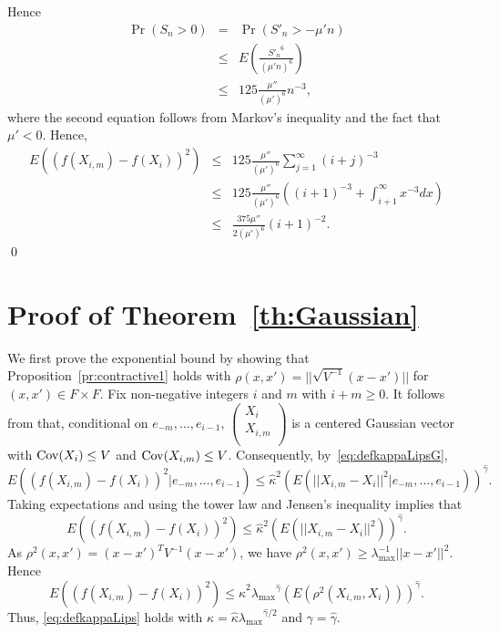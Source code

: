 \documentclass[a4paper,11pt]{article}
\begin{document}
Hence\begin{eqnarray*}
\Pr(S_{n}>0)&=&\Pr(S'_{n}>-\mu'n)\\
&\le&E(\frac{{S'_{n}}^{6}}{(\mu'n)^{6}})\\
&\le&125\frac{\mu''}{(\mu')^{6}}n^{-3},
\end{eqnarray*}where the second equation follows from Markov's inequality and the fact that \(\mu'<0\). Hence,\begin{eqnarray*}
E((f(X_{i,m})-f(X_{i}))^{2})
&\le&125\frac{\mu''}{(\mu')^{6}}\sum^{\infty}_{j=1}(i+j)^{-3}\\
&\le&125\frac{\mu''}{(\mu')^{6}}\left((i+1)^{-3}+\int^{\infty}_{i+1}x^{-3}dx\right)\\
&\leq&\frac{375\mu''}{2(\mu')^{6}}(i+1)^{-2}.
\end{eqnarray*}\qed \section{Proof of Theorem~\ref{th:Gaussian}}
We first prove the exponential bound by showing that Proposition~\ref{pr:contractive1} holds with  \(\rho(x,x')=||\sqrt{V^{-1}}(x-x')||\) for \((x,x')\in F\times F\). Fix non-negative integers \(i\) and \(m\) with \(i+m\ge0\). 
It follows from \cite[Lemma 1]{kahaleGaussian2019} that, conditional on \(e_{-m},\dots,e_{i-1}\),   \(\begin{pmatrix}X_{i} \\
X_{i,m} \\
\end{pmatrix}\)  is a centered Gaussian vector with       \({\rm Cov}(X_{i})\le V\) and
  \({\rm Cov}(X_{i,m})\le V\). Consequently, by~\eqref{eq:defkappaLipsG},
\begin{equation*}
E((f(X_{i,m})-f(X_{i}))^{2}|e_{-m},\dots,e_{i-1})\leq \hat\kappa^{2}( E(||X_{i,m}-X_{i}||^{2}|e_{-m},\dots,e_{i-1}))^{\hat\gamma}.
\end{equation*}Taking expectations and using the tower law and Jensen's inequality implies that
\begin{equation}\label{eq:GaussianLipschitz}
E((f(X_{i,m})-f(X_{i}))^{2})\leq \hat\kappa^{2}( E(||X_{i,m}-X_{i}||^{2}))^{\hat\gamma}.
\end{equation}As \(\rho^{2}(x,x')=(x-x')^{T}{V^{-1}}(x-x')\), we have \(\rho^{2}(x,x')\ge \lambda_{\max}^{-1}||x-x'||^{2}\). Hence
\begin{equation*}
E((f(X_{i,m})-f(X_{i}))^{2})\leq \hat\kappa^{2}{\lambda_{\max}}^{\hat\gamma}( E(\rho^{2}(X_{i,m},X_{i})))^{\hat\gamma}.
\end{equation*}  
Thus, \eqref{eq:defkappaLips} holds with \(\kappa=\hat \kappa{\lambda_{\max}}^{\hat \gamma /2}\) and \(\gamma=\hat \gamma\). 
\end{document}
